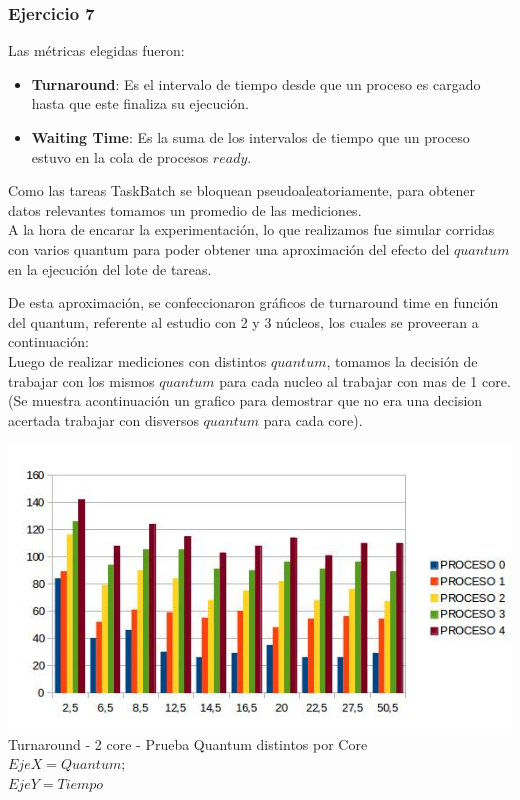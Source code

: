  \subsubsection[Resolución Ejercicio 7]{Ejercicio 7}
 Las métricas elegidas fueron:
\begin{itemize}
 \item \textbf{Turnaround}: Es el intervalo de tiempo desde que un proceso es cargado hasta que este finaliza su ejecución.
 \item \textbf{Waiting Time}: Es la suma de los intervalos de tiempo que un proceso estuvo en la cola de procesos $ready$.
\end{itemize}

\indent \indent Como las tareas TaskBatch se bloquean pseudoaleatoriamente, 
para obtener datos relevantes tomamos un promedio de las mediciones.\\
\indent A la hora de encarar la experimentación, lo que realizamos fue simular corridas con 
varios quantum para poder obtener una aproximación del efecto del $quantum$ en la ejecución del lote de tareas. 

\indent De esta aproximación, se confeccionaron gráficos de turnaround time en función del quantum, 
referente al estudio con 2 y 3 núcleos, los cuales se proveeran a continuación:\\

\indent Luego de realizar mediciones con distintos $quantum$, tomamos la decisión de trabajar con los mismos $quantum$ para cada nucleo
al trabajar con mas de 1 core. (Se muestra acontinuación un grafico para demostrar que no era una decision acertada trabajar
con disversos $quantum$ para cada core).

\begin{center}
    	\includegraphics[width=1\textwidth]{./EJ7/turnarounddistquan.png}
	{Turnaround - 2 core - Prueba Quantum distintos por Core}\\
	{$Eje X = Quantum; $\\$ Eje Y = Tiempo$}\\
 \end{center}

